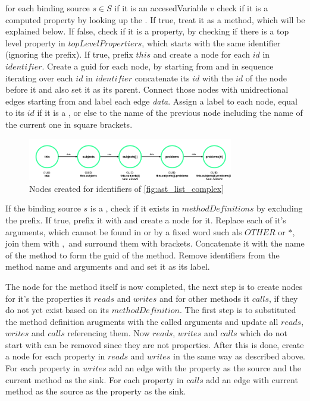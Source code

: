 for each binding source $s \in S$
if it is an accesedVariable $v$
check if it is a computed property by looking up the . If true, treat it as a method, which will be explained below. If false, check if it is a property, by checking if there is a top level property in $topLevelPropertiers$, which starts with the same identifier (ignoring the  prefix).
If true, prefix $this$ and create a node for each $id$ in $identifier$. Create a \gls{guid} for each node, by starting from  and in sequence iterating over each $id$ in $identifier$ concatenate its $id$ with the $id$ of the node before it and also set it as its parent. Connect those nodes  with unidrectional edges starting from  and label each edge \textit{data}. Assign a label to each node, equal to its $id$ if it is a , or else to the name of the previous node including the name of the current one in square brackets. %
\begin{figure}[H]
    \includegraphics[width=0.8\textwidth]{images/graph_numeric_generic.png}
     \caption{Nodes created for identifiers of \ref{fig:ast_list_complex} }
     \label{fig:ast_list_complex_nodes}
\end{figure}

If the binding source $s$ is a , check if it exists in $methodDefinitions$ by excluding the  prefix. If true, prefix it with  and create a node for it. Replace each of it's arguments, which cannot be found in  or  by a fixed word such als $OTHER$ or $*$, join them with $,$ and surround them with brackets. Concatenate it with the name of the method to form the \gls{guid} of the method. Remove  identifiers from the method name and arguments and and set it as its label.

The node for the method itself is now completed, the next step is to create nodes for it's the properties it $reads$ and $writes$ and for other methods it $calls$, if they do not yet exist based on its $methodDefinition$. The first step is to substituted the method definition arugments with the called arguments and update all $reads$, $writes$ and $calls$ referencing them. Now $reads$, $writes$ and $calls$ which do not start with  can be removed since they are not properties. After this is done, create a node for each property in $reads$ and $writes$ in the same way as described above. 
For each property in $writes$ add an edge with the property as the source and the current method as the sink. For each property in $calls$ add an edge with current method as the source as the property as the sink.

